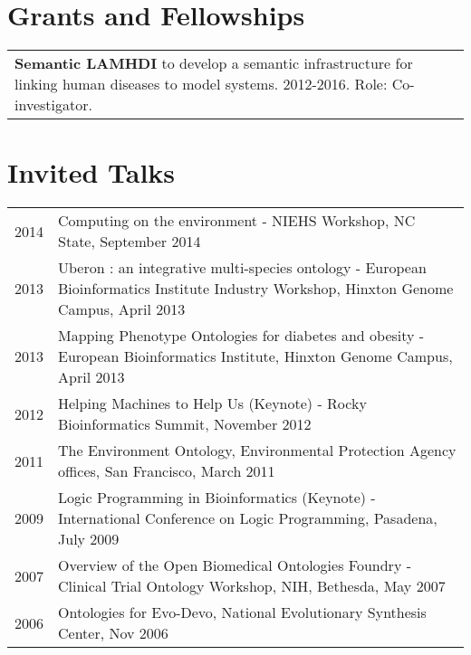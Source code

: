 \documentclass[11pt,fullpage]{article}
\begin{document}
\section*{Grants and Fellowships}

\begin{tabular}{>{\everypar{\hangindent0.5in}}p{6in}}
	\textbf{Semantic LAMHDI} to develop a semantic infrastructure
        for linking human diseases to model systems. 2012-2016. Role: Co-investigator. \\
\end{tabular}


\section*{Invited Talks}

\begin{longtable}{p{0.5in}|p{5.5in}}


 2014 & Computing on the environment - NIEHS Workshop, 
 NC State, September 2014\\

 2013 & Uberon : an integrative multi-species ontology - European Bioinformatics Institute Industry Workshop, 
 Hinxton Genome Campus, April 2013\\

 2013 & Mapping Phenotype Ontologies for diabetes and obesity - European Bioinformatics Institute, 
 Hinxton Genome Campus, April 2013\\

 2012 & Helping Machines to Help Us (Keynote) - Rocky Bioinformatics
 Summit, November 2012\\

 2011 & The Environment Ontology, Environmental Protection Agency offices, San Francisco, March 2011 \\

 2009 & Logic Programming in Bioinformatics (Keynote) - International
 Conference on Logic Programming, Pasadena, July 2009 \\

 2007 & Overview of the Open Biomedical Ontologies Foundry - Clinical Trial Ontology Workshop, NIH, Bethesda, May 2007 \\

 2006 & Ontologies for Evo-Devo, National Evolutionary Synthesis Center, Nov 2006 \\


\end{longtable}
\end{document}
